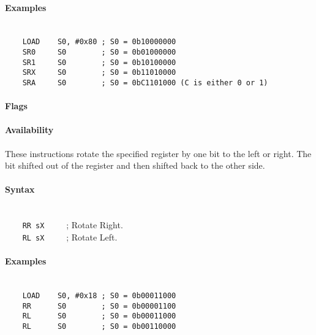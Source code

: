         \paragraph{Examples}
            ~\\
            \verb'    LOAD    S0, #0x80 ; S0 = 0b10000000'\\
            \verb'    SR0     S0        ; S0 = 0b01000000'\\
            \verb'    SR1     S0        ; S0 = 0b10100000'\\
            \verb'    SRX     S0        ; S0 = 0b11010000'\\
            \verb'    SRA     S0        ; S0 = 0bC1101000 (C is either 0 or 1)'

        \paragraph{Flags}

        \paragraph{Availability}
            \pbavailability{\yes}{\yes}{\yes}{\yes}{\yes}

    \clearpage
        These instructions rotate the specified register by one bit to the left or right. The bit shifted out of the register and then shifted back to the other side.

        \paragraph{Syntax}
            ~\\
            \verb'    RR sX     '; Rotate Right.\\
            \verb'    RL sX     '; Rotate Left.

        \paragraph{Examples}
            ~\\
            \verb'    LOAD    S0, #0x18 ; S0 = 0b00011000'\\
            \verb'    RR      S0        ; S0 = 0b00001100'\\
            \verb'    RL      S0        ; S0 = 0b00011000'\\
            \verb'    RL      S0        ; S0 = 0b00110000'

